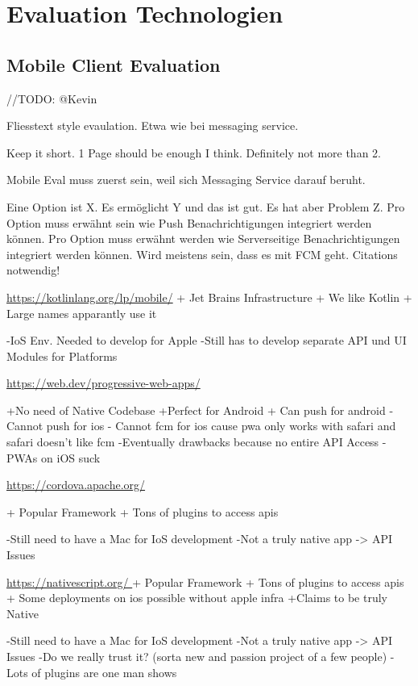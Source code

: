 \section{Evaluation Technologien}\label{sec:evaluation-technologien}

\subsection{Mobile Client Evaluation}\label{subsec:mobile-client-eval}

//TODO: @Kevin

Fliesstext style evaulation. Etwa wie bei messaging service.

Keep it short.
1 Page should be enough I think.
Definitely not more than 2.

Mobile Eval muss zuerst sein, weil sich Messaging Service darauf beruht.

Eine Option ist X. Es ermöglicht Y und das ist gut. Es hat aber Problem Z.
Pro Option muss erwähnt sein wie Push Benachrichtigungen integriert werden können.
Pro Option muss erwähnt werden wie Serverseitige Benachrichtigungen integriert werden können.
Wird meistens sein, dass es mit FCM geht.
Citations notwendig!

\url{https://kotlinlang.org/lp/mobile/}
    + Jet Brains Infrastructure
    + We like Kotlin
    + Large names apparantly use it

    -IoS Env. Needed to develop for Apple 
    -Still has to develop separate API und UI Modules for Platforms 

\url{https://web.dev/progressive-web-apps/ }
	
    +No need of Native Codebase
    +Perfect for Android
    + Can push for android
    - Cannot push for ios
    - Cannot fcm for ios cause pwa only works with safari and safari doesn't like fcm
    -Eventually drawbacks because no entire API Access 
    -PWAs on iOS suck

\url{https://cordova.apache.org/} 

    + Popular Framework
    + Tons of plugins to access apis

    -Still need to have a Mac for IoS development  
    -Not a truly native app -> API Issues
 

\url{https://nativescript.org/ }
    + Popular Framework
    + Tons of plugins to access apis
    + Some deployments on ios possible without apple infra
    +Claims to be truly Native

    -Still need to have a Mac for IoS development
    -Not a truly native app -> API Issues
    -Do we really trust it? (sorta new and passion project of a few people)
    - Lots of plugins are one man shows

